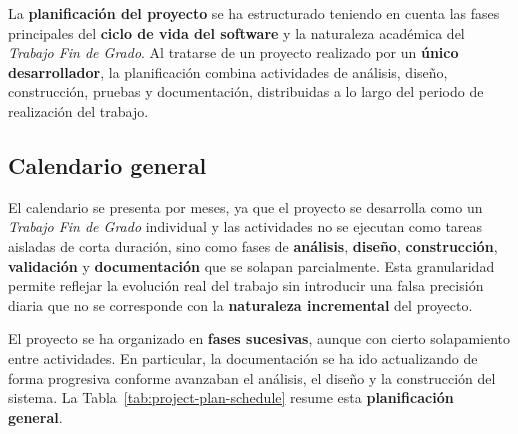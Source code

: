 La \textbf{planificación del proyecto} se ha estructurado teniendo en cuenta las fases principales del \textbf{ciclo de vida del software} y la naturaleza académica del \textit{Trabajo Fin de Grado}. Al tratarse de un proyecto realizado por un \textbf{único desarrollador}, la planificación combina actividades de análisis, diseño, construcción, pruebas y documentación, distribuidas a lo largo del periodo de realización del trabajo.

\subsection{Calendario general}

El calendario se presenta por meses, ya que el proyecto se desarrolla como un \textit{Trabajo Fin de Grado} individual y las actividades no se ejecutan como tareas aisladas de corta duración, sino como fases de \textbf{análisis}, \textbf{diseño}, \textbf{construcción}, \textbf{validación} y \textbf{documentación} que se solapan parcialmente. Esta granularidad permite reflejar la evolución real del trabajo sin introducir una falsa precisión diaria que no se corresponde con la \textbf{naturaleza incremental} del proyecto.

El proyecto se ha organizado en \textbf{fases sucesivas}, aunque con cierto solapamiento entre actividades. En particular, la documentación se ha ido actualizando de forma progresiva conforme avanzaban el análisis, el diseño y la construcción del sistema. La Tabla~\ref{tab:project-plan-schedule} resume esta \textbf{planificación general}.

